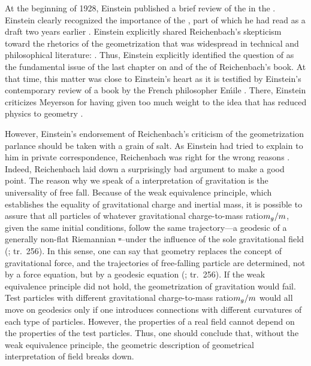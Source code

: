 \documentclass[submitted]{article}
\newcommand{\ctmr}{charge-to-mass ratio\xspace}
\newcommand{\ctmrg}{\ensuremath{\hfrac{m_g}{m}}\xspace}
\renewcommand{\me}{;~m.e.{}}
\newcommand{\PRZL}{\citetitle{Reichenbach1928}\xspace}
\renewcommand{\rzlp}[2]{(\cite[#1]{Reichenbach1928}; tr.\ #2)\xspace}
\begin{document}
At the beginning of 1928, Einstein published a brief review of the \PRZL \citep{Einstein1928d} in the  . Einstein clearly recognized the importance of the \Ap, part of which he had read as a draft two years earlier . Einstein explicitly shared Reichenbach's skepticism toward the rhetorics of the geometrization that was widespread in technical and philosophical literature:  \citep[][20\me]{Einstein1928d}. Thus, Einstein explicitly identified the question of  as the fundamental issue of the last chapter on \gr and of the \Ap of Reichenbach's book. At that time, this matter was close to Einstein's heart \citep{Lehmkuhl2014} as it is testified by Einstein's contemporary review \citep{Einstein1928} of a book by the French philosopher E\'mile \citet{Meyerson1925}. There, Einstein criticizes Meyerson for having given too much weight to the idea that \gr has reduced physics to geometry .

However, Einstein's endorsement of Reichenbach's criticism of the geometrization parlance should be taken with a grain of salt. As Einstein had tried to explain to him in private correspondence, Reichenbach was right for the wrong reasons . Indeed, Reichenbach laid down a surprisingly bad argument to make a good point. The reason why we speak of a  interpretation of gravitation is the universality of free fall. Because of the weak equivalence principle, which establishes the equality of gravitational charge and inertial mass, it is possible to assure that all particles of whatever gravitational \ctmr \ctmrg, given the same initial conditions, follow the same trajectory---a geodesic of a generally non-flat Riemannian \st---under the influence of the sole gravitational field \rzlp{293}{256}. In this sense, one can say that geometry replaces the concept of gravitational force, and the trajectories of free-falling particle are determined, not by a force equation, but by a geodesic equation \rzlp{293}{256}. If the weak equivalence principle did not hold, the geometrization of gravitation would fail. Test particles with different gravitational \ctmr \ctmrg would all move on geodesics only if one introduces connections with different curvatures of each type of particles. However, the properties of a real field cannot depend on the properties of the test particles. Thus, one should conclude that, without the weak equivalence principle, the geometric description of geometrical interpretation of field breaks down. 
\end{document}
